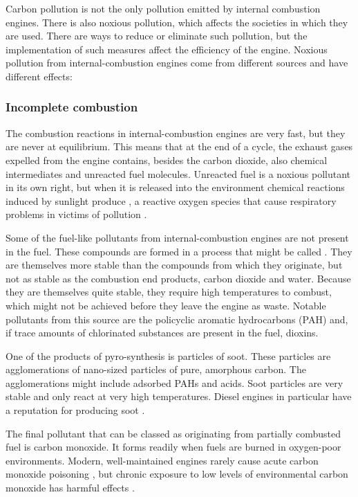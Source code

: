 Carbon pollution is not the only pollution emitted by internal combustion
engines. There is also noxious pollution, which affects the societies in which
they are used. There are ways to reduce or eliminate such pollution, but the
implementation of such measures affect the efficiency of the engine. Noxious
pollution from internal\hyp{}combustion engines come from different sourc\-es
and have different effects:

\subsubsection{Incomplete combustion}
\label{sec:IncompleteCombustion}

The combustion reactions in internal\hyp{}combustion engines are very fast, but
they are never at equilibrium. This means that at the end of a cycle, the
exhaust gases expelled from the engine contains, besides the carbon dioxide,
also chemical intermediates and unreacted fuel molecules. Unreacted fuel is a
noxious pollutant in its own right, but when it is released into the environment
chemical reactions induced by sunlight produce , a reactive
oxygen species that cause respiratory problems in victims of pollution
\autocite{Davidson1998}.

Some of the fuel-like pollutants from internal\hyp{}combustion engines are not
present in the fuel. These compounds are formed in a process that might be
called . They are themselves more stable than the
compounds from which they originate, but not as stable as the combustion end
products, carbon dioxide and water. Because they are themselves quite stable,
they require high temperatures to combust, which might not be achieved before
they leave the engine as waste. Notable pollutants from this source are the
policyclic aromatic hydrocarbons (PAH) and, if trace amounts of chlorinated
substances are present in the fuel, dioxins.

One of the products of pyro-synthesis is particles of soot. These particles are
agglomerations of nano-sized particles of pure, amorphous carbon. The
agglomerations might include adsorbed PAHs and acids. Soot particles are very
stable and only react at very high temperatures. Diesel engines in particular
have a reputation for producing soot \autocite{Mohankumar2017}.

The final pollutant that can be classed as originating from partially combusted
fuel is carbon monoxide. It forms readily when fuels are burned in oxygen-poor
environments. Modern, well-maintained engines rarely cause acute carbon monoxide
poisoning \autocite{Reumuth2018}, but chronic exposure to low levels of
environmental carbon monoxide has harmful effects \autocite{Wright2002}.

